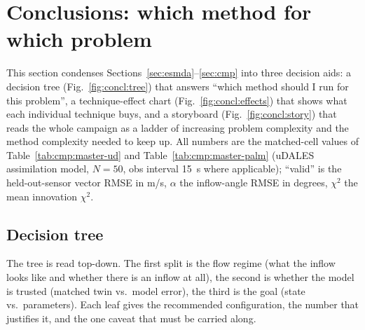 \section{Conclusions: which method for which problem}
\label{sec:conclusions}

This section condenses Sections~\ref{sec:esmda}--\ref{sec:cmp} into three
decision aids: a decision tree (Fig.~\ref{fig:concl:tree}) that answers ``which method
should I run for this problem'', a technique-effect chart (Fig.~\ref{fig:concl:effects})
that shows what each individual technique buys, and a storyboard
(Fig.~\ref{fig:concl:story}) that reads the whole campaign as a ladder of increasing
problem complexity and the method complexity needed to keep up. All numbers are the
matched-cell values of Table~\ref{tab:cmp:master-ud} and
Table~\ref{tab:cmp:master-palm} (uDALES assimilation model, $N=50$, obs interval 15~s
where applicable); ``valid'' is the held-out-sensor vector RMSE in m/s, $\alpha$ the
inflow-angle RMSE in degrees, $\chi^2$ the mean innovation $\chi^2$.

\subsection{Decision tree}

The tree is read top-down. The first split is the flow regime (what the inflow looks
like and whether there is an inflow at all), the second is whether the model is
trusted (matched twin vs.\ model error), the third is the goal (state vs.\ parameters).
Each leaf gives the recommended configuration, the number that justifies it, and the
one caveat that must be carried along.

